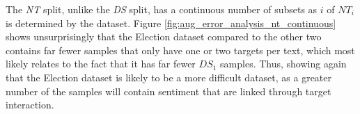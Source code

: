The \textit{NT} split, unlike the \textit{DS} split, has a continuous number of subsets as $i$ of $NT_i$ is determined by the dataset. Figure \ref{fig:aug_error_analysis_nt_continuous} shows unsurprisingly that the Election dataset compared to the other two contains far fewer samples that only have one or two targets per text, which most likely relates to the fact that it has far fewer $DS_1$ samples. Thus, showing again that the Election dataset is likely to be a more difficult dataset, as a greater number of the samples will contain sentiment that are linked through target interaction. 
\begin{figure}[h!]
    \begin{floatrow}
    \end{floatrow}
\end{figure}
